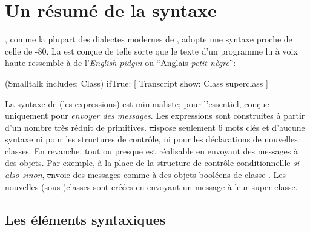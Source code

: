 \documentclass[a4paper,10pt,twoside]{book}
\begin{document}
	\renewcommand{\nnbb}[2]{} %
	\sloppy
\fi
\chapter{Un r\'esum\'e de la syntaxe}
\label{cha:syntax}



\sq, comme la plupart des dialectes modernes de \st, adopte une syntaxe proche de celle de \st-80.
La  est con\c{c}ue de telle sorte que le texte d'un programme lu \`{a} voix haute ressemble \`{a} de l'\emph{English pidgin} ou ``Anglais \emph{petit-nègre}'':

\begin{code}{}
(Smalltalk includes: Class) ifTrue: [ Transcript show: Class superclass ]
\end{code}

\noindent
La syntaxe de \sq (\ie les expressions) est minimaliste; pour l'essentiel, con\c{c}ue uniquement pour \emph{envoyer des messages}.
Les expressions sont construites \`{a} partir d'un nombre tr\`{e}s r\'{e}duit de primitives.
\st dispose seulement 6 mots cl\'{e}s et d'aucune syntaxe ni pour les structures de contr\^{o}le, ni pour les d\'{e}clarations de nouvelles classes.
En revanche, tout ou presque est r\'{e}alisable en envoyant des messages \`{a} des objets.
Par exemple, \`{a} la place de la structure de contr\^{o}le conditionnellle \emph{si-also-sinon}, \st envoie des messages comme  \`{a} des objets booléens de classe .
Les nouvelles \mbox{(sous-)classes} sont cr\'{e}\'{e}es en envoyant un message \`{a} leur super-classe.

\section{Les \'{e}l\'{e}ments syntaxiques }
\end{document}
